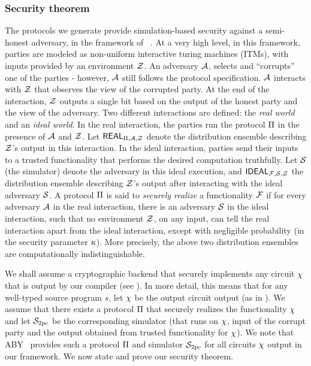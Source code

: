 
\subsubsection*{Security theorem} The protocols we generate provide
simulation-based security against a semi-honest adversary, in the
framework of ~\cite{gmw,can00,can01}. At a very high level, in this
framework, parties are modeled as non-uniform interactive turing
machines (ITMs), with inputs provided by an environment $\mathcal{Z}$. An
adversary $\mathcal{A}$, selects and ``corrupts'' one of the parties -
however, $\mathcal{A}$ still follows the protocol specification. $\mathcal{A}$
interacts with $\mathcal{Z}$ that observes the view of the corrupted
party. At the end of the interaction, $\mathcal{Z}$ outputs a single bit based on the output of the honest party and the view of the adversary. Two
different interactions are defined: the {\em real world} and an {\em
  ideal world}. In the real interaction, the parties run the protocol
$\Pi$ in the presence of $\mathcal{A}$ and $\mathcal{Z}$. Let
$\mathsf{REAL}_{\Pi,\mathcal{A},\mathcal{Z}}$ denote the  distribution ensemble
describing $\mathcal{Z}$'s output in this interaction. 
In the ideal interaction, parties send their inputs to  a
trusted functionality that performs the desired
computation truthfully. Let $\mathcal{S}$ (the simulator) denote the
adversary in this ideal execution, and $\mathsf{IDEAL}_{\mathcal{F},\mathcal{S},\mathcal{Z}}$
the distribution ensemble describing $\mathcal{Z}$'s output after
interacting with the ideal adversary $\mathcal{S}$. A
protocol $\Pi$ is said to {\em securely realize} a functionality
$\mathcal{F}$ if for every adversary $\mathcal{A}$ in the real interaction, there is
an adversary $\mathcal{S}$ in the ideal interaction, such that no
environment $\mathcal{Z}$, on any input, can tell the real interaction apart
from the ideal interaction, except with negligible probability (in the
security parameter $\kappa$). More precisely, the above two
distribution ensembles  are computationally indistinguishable. 

We shall assume a cryptographic \mpc backend that securely implements
any circuit $\chi$ that is output by our compiler
(see ). In more detail, this means that for any
well-typed source program $s$, let $\chi$ be the output circuit output
(as in ). We assume that there
exists a \mpc protocol $\Pi$ that securely realizes the
functionality $\chi$ and let $\simu_{\tiny{2pc}}$ be the
corresponding simulator  (that runs on $\chi$, input of the corrupt
party and the output obtained from trusted functionality for
$\chi$). We note that ABY~\cite{aby} provides such a protocol
$\Pi$ and simulator $\simu_{\tiny{2pc}}$ for all circuits $\chi$
output in our framework. We now state and prove our
security theorem. 
 
